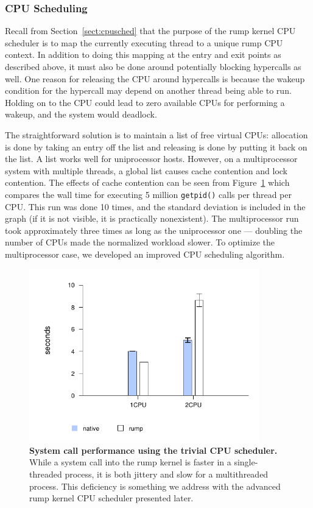 \subsubsection{CPU Scheduling}
\label{sect:cpuschedimpl}

Recall from Section~\ref{sect:cpusched} that the purpose of the
rump kernel CPU scheduler is to map the currently executing thread
to a unique rump CPU context.  In addition to doing this mapping at the
entry and exit points as described above, it must also be done
around potentially blocking hypercalls as well.  One reason
for releasing the CPU around hypercalls is because the wakeup
condition for the hypercall may depend on another thread being able
to run.  Holding on to the CPU could lead to zero available CPUs
for performing a wakeup, and the system would deadlock.

The straightforward solution is to maintain a list of free virtual
CPUs: allocation is done by taking an entry off the list and
releasing is done by putting it back on the list.  A list works well
for uniprocessor hosts.  However, on a multiprocessor system with
multiple threads, a global list causes cache contention and lock
contention.  The effects of cache contention can be seen from
Figure~\ref{fig:syscall_simple} which compares the wall time for executing
5 million \verb+getpid()+ calls per thread per CPU.  This run was done
10 times, and the standard deviation is included in the graph (if it
is not visible, it is practically nonexistent).  The multiprocessor
run took approximately three times as long as the uniprocessor one ---
doubling the number of CPUs made the normalized workload slower.
To optimize the multiprocessor case, we developed an improved CPU
scheduling algorithm.

\begin{figure}[h!]
\includegraphics[width=10cm]{sched1}
\caption[System call performance using the trivial CPU scheduler]{
\textbf{System call performance using the trivial CPU scheduler.}
While a system call into the rump kernel is faster in a single-threaded
process, it is both jittery and slow for a multithreaded process.
This deficiency is something we address with the advanced rump kernel
CPU scheduler presented later.
}
\label{fig:syscall_simple}
\end{figure}

